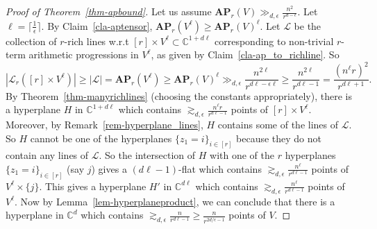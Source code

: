 \documentclass[11pt]{article}
\def\L{{\mathcal L}}
\def\C{{\mathbb{C}}}
\def\AP{{\mathbf{AP}}}
\begin{document}
\begin{proof}[Proof of Theorem~\ref{thm-apbound}]

Let us assume $\AP_r(V)\gg_{d,\epsilon} \frac{n^2}{r^{d-\epsilon}}$. Let $\ell=\lceil\frac{1}{\epsilon}\rceil$. By Claim~\ref{cla-aptensor}, $\AP_r(V^\ell)\ge \AP_r(V)^\ell$. Let $\L$ be the collection of $r$-rich lines w.r.t $[r]\times V^\ell\subset \C^{1+d\ell}$ corresponding to non-trivial $r$-term arithmetic progressions in $V^\ell$, as given by Claim~\ref{cla-ap_to_richline}. So
 $$|\L_r([r]\times V^\ell)|\ge |\L| = \AP_r(V^\ell)\ge \AP_r(V)^\ell\gg_{d,\epsilon} \frac{n^{2\ell}}{r^{d\ell-\epsilon\ell}}\ge \frac{n^{2\ell}}{r^{d\ell -1}}= \frac{(n^{\ell}r)^2}{r^{d\ell+1}}.$$ By Theorem~\ref{thm-manyrichlines} (choosing the constants appropriately), there is a hyperplane $H$ in $\mathbb{C}^{1+d\ell}$ which contains $\gtrsim_{d,\epsilon} \frac{n^\ell r}{r^{d\ell-1}}$ points of $[r]\times V^\ell$. Moreover, by Remark~\ref{rem-hyperplane_lines}, $H$ contains some of the lines of $\L$. So $H$ cannot be one of the hyperplanes $\{z_{1}=i\}_{i\in [r]}$ because they do not contain any lines of $\L$. So the intersection of $H$ with one of the $r$ hyperplanes $\{z_{1}=i\}_{i\in [r]}$ (say $j$) gives a $(d\ell-1)$-flat which contains  $\gtrsim_{d,\epsilon} \frac{n^\ell}{r^{d\ell-1}}$ points of $V^\ell\times \{j\}$. This gives a hyperplane $H'$ in $\C^{d\ell}$ which contains $\gtrsim_{d,\epsilon} \frac{n^\ell}{r^{d\ell-1}}$ points of $V^\ell$. Now by Lemma~\ref{lem-hyperplaneproduct}, we can conclude that there is a hyperplane in $\mathbb{C}^d$ which contains $\gtrsim_{d,\epsilon} \frac{n}{r^{d\ell-1}}\ge \frac{n}{r^{2d/\epsilon-1}}$ points of $V$.
\end{proof}
\end{document}
